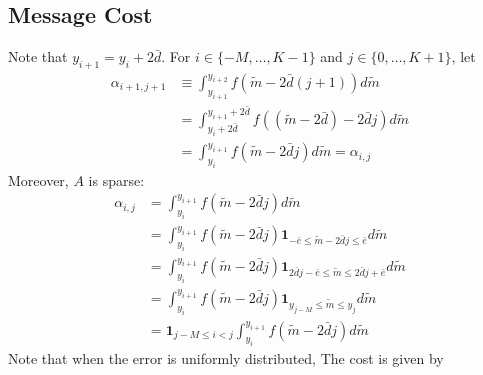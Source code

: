 \documentclass[12pt]{article}
\begin{document}
\subsection{Message Cost}
Note that $y_{i+1}=y_{i}+2\bar{d}$. For $i\in\{-M,\ldots,K-1\}$ and $j\in\{0,\ldots,K+1\}$, let
\begin{align}
	\alpha_{i+1,j+1}&\equiv\int_{y_{i+1}}^{y_{i+2}}{f(\widetilde{m}-2\bar{d}(j+1))d\widetilde{m}}\label{eq:alpha}\\
	&=\int_{y_{i}+2\bar{d}}^{y_{i+1}+2\bar{d}}{f((\widetilde{m}-2\bar{d})-2\bar{d}j)d\widetilde{m}}\\
	&=\int_{y_{i}}^{y_{i+1}}{f(\widetilde{m}-2\bar{d}j)d\widetilde{m}}=\alpha_{i,j}
\end{align}
Moreover, $A$ is sparse:
\begin{align}
	\alpha_{i,j}&=\int_{y_{i}}^{y_{i+1}}{f(\widetilde{m}-2\bar{d}j)d\widetilde{m}}\\
	&=\int_{y_{i}}^{y_{i+1}}{f(\widetilde{m}-2\bar{d}j)\mathbf{1}_{-\bar{e}\leq\widetilde{m}-2\bar{d}j\leq\bar{e}}d\widetilde{m}}\\
	&=\int_{y_{i}}^{y_{i+1}}{f(\widetilde{m}-2\bar{d}j)\mathbf{1}_{2\bar{d}j-\bar{e}\leq\widetilde{m}\leq 2\bar{d}j+\bar{e}}d\widetilde{m}}\\
	&=\int_{y_{i}}^{y_{i+1}}{f(\widetilde{m}-2\bar{d}j)\mathbf{1}_{y_{j-M}\leq\widetilde{m}\leq y_{j}}d\widetilde{m}}\\
	&=\mathbf{1}_{j-M\leq i<j}\int_{y_{i}}^{y_{i+1}}{f(\widetilde{m}-2\bar{d}j)d\widetilde{m}}
\end{align}
Note that when the error is uniformly distributed, The cost is given by 
\end{document}
